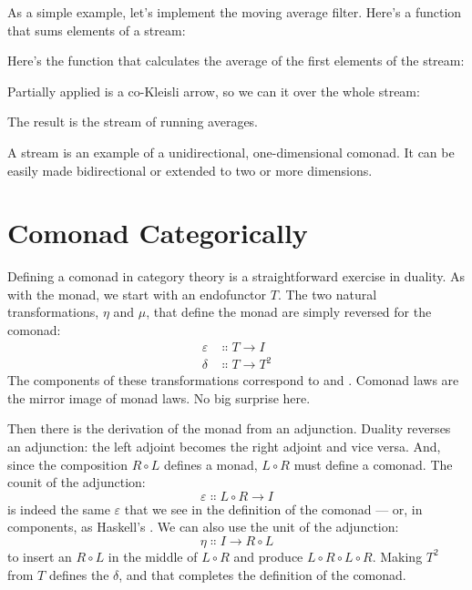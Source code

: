 As a simple example, let's implement the moving average filter. Here's a
function that sums  elements of a stream:

Here's the function that calculates the average of the first 
elements of the stream:

Partially applied  is a co-Kleisli arrow, so we can
 it over the whole stream:

The result is the stream of running averages.

A stream is an example of a unidirectional, one-dimensional comonad. It
can be easily made bidirectional or extended to two or more dimensions.

\section{Comonad Categorically}

Defining a comonad in category theory is a straightforward exercise in
duality. As with the monad, we start with an endofunctor $T$. The
two natural transformations, $\eta$ and $\mu$, that define the monad are simply
reversed for the comonad:
\[
	\begin{aligned}
		\varepsilon & \Colon T \to I   \\
		\delta      & \Colon T \to T^2
	\end{aligned}
\]
The components of these transformations correspond to 
and . Comonad laws are the mirror image of monad laws.
No big surprise here.

Then there is the derivation of the monad from an adjunction. Duality
reverses an adjunction: the left adjoint becomes the right adjoint and
vice versa. And, since the composition $R \circ L$ defines a monad,
$L \circ R$ must define a comonad. The counit of the adjunction:
\[\varepsilon \Colon L \circ R \to I\]
is indeed the same $\varepsilon$ that we see in the definition of the comonad ---
or, in components, as Haskell's . We can also use the
unit of the adjunction:
\[\eta \Colon I \to R \circ L\]
to insert an $R \circ L$ in the middle of $L \circ R$ and
produce $L \circ R \circ L \circ R$. Making $T^2$ from $T$
defines the $\delta$, and that completes the definition of the comonad.

